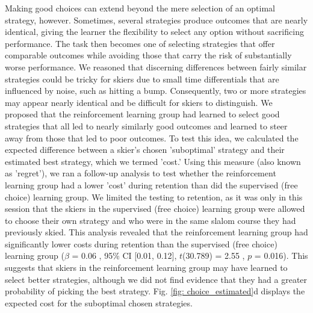 \documentclass[pdflatex,sn-nature]{sn-jnl}%
\theoremstyle{thmstyleone}%
\theoremstyle{thmstyletwo}%
\theoremstyle{thmstylethree}%
\begin{document}
Making good choices can extend beyond the mere selection of an optimal strategy, however. Sometimes, several strategies produce outcomes that are nearly identical, giving the learner the flexibility to select any option without sacrificing performance. The task then becomes one of selecting strategies that offer comparable outcomes while avoiding those that carry the risk of substantially worse performance. We reasoned that discerning differences between fairly similar strategies could be tricky for skiers due to small time differentials that are influenced by noise, such as hitting a bump. Consequently, two or more strategies may appear nearly identical and be difficult for skiers to distinguish. We proposed that the reinforcement learning group had learned to select good strategies that all led to nearly similarly good outcomes and learned to steer away from those that led to poor outcomes. To test this idea, we calculated the expected difference between a skier's chosen 'suboptimal' strategy and their estimated best strategy, which we termed 'cost.' Using this measure (also known as 'regret'), we ran a follow-up analysis to test whether the reinforcement learning group had a lower 'cost' during retention than did the supervised (free choice) learning group. We limited the testing to retention, as it was only in this session that the skiers in the supervised (free choice) learning group were allowed to choose their own strategy and who were in the same slalom course they had previously skied. This analysis revealed that the reinforcement learning group had significantly lower costs during retention than the supervised (free choice) learning group ($\beta$ = 0.06 , 95\% CI [0.01, 0.12], $t$(30.789) = 2.55 , $p$ = 0.016). This suggests that skiers in the reinforcement learning group may have learned to select better strategies, although we did not find evidence that they had a greater probability of picking the best strategy. Fig. \ref{fig: choice_estimated}d displays the expected cost for the suboptimal chosen strategies.
\end{document}
